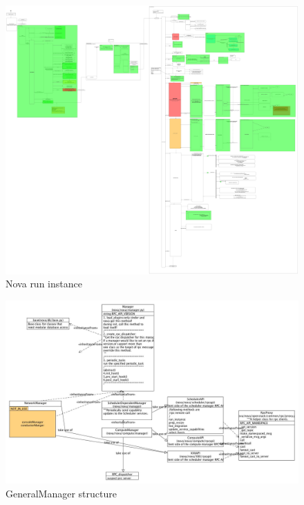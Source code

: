 \documentclass[10pt]{report}
\begin{document}
			\begin{figure}[!htbp]
				
				\includegraphics[width=\textwidth,height=\textheight,keepaspectratio] {runInstance}
				\caption{Nova run instance}
				\label{runInstance}
			\end{figure}
			\begin{figure}[!htbp]
				\includegraphics[width=\textwidth,height=\textheight,keepaspectratio] {Manager}
				\caption{GeneralManager structure}
				\label{manager}
			\end{figure}
\end{document}

